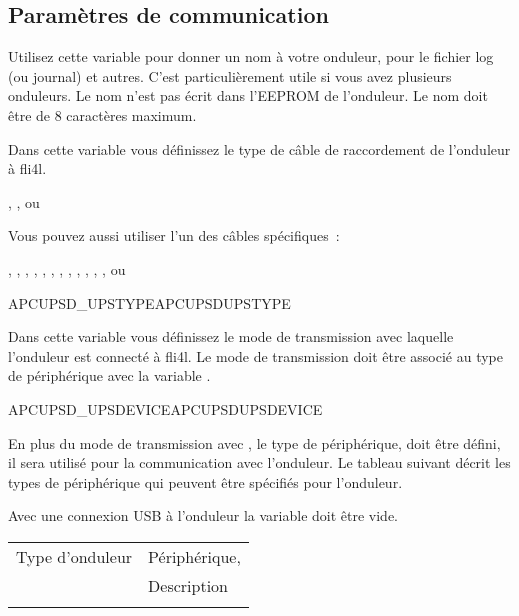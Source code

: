 \subsection{Paramètres de communication}
\begin{description}


  Utilisez cette variable pour donner un nom à votre onduleur, pour le fichier
  log (ou journal) et autres.
  C'est particulièrement utile si vous avez plusieurs onduleurs. Le nom n'est
  pas écrit dans l'EEPROM de l'onduleur. Le nom doit être de 8 caractères maximum.


 Dans cette variable vous définissez le type de câble de raccordement de l'onduleur
 à fli4l.

   , ,  ou 

  Vous pouvez aussi utiliser l'un des câbles spécifiques~:

  , , , ,
  , , , ,
  , , , ,
   ou 


 {APCUPSD\_UPSTYPE}{APCUPSDUPSTYPE}

  Dans cette variable vous définissez le mode de transmission avec laquelle
  l'onduleur est connecté à fli4l. Le mode de transmission doit être associé
  au type de périphérique avec la variable .


 {APCUPSD\_UPSDEVICE}{APCUPSDUPSDEVICE}

  En plus du mode de transmission avec ,
  le type de périphérique, doit être défini, il sera utilisé pour la
  communication avec l'onduleur. Le tableau suivant décrit les types de
  périphérique qui peuvent être spécifiés pour l'onduleur.

  Avec une connexion USB à l'onduleur la variable 
  doit être vide.

\begin{tabular}{p{20mm}p{120mm}}
  Type d'onduleur & Périphérique,  \\ & Description
  \\\\


\end{tabular}
\end{description}
